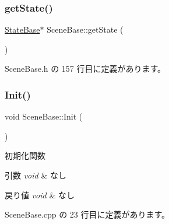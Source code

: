 \subsubsection{\texorpdfstring{get\+State()}{getState()}}
{\footnotesize\ttfamily \mbox{\hyperlink{class_scene_base_1_1_state_base}{State\+Base}}$\ast$ Scene\+Base\+::get\+State (\begin{DoxyParamCaption}{ }\end{DoxyParamCaption})\hspace{0.3cm}{\ttfamily [inline]}}



 Scene\+Base.\+h の 157 行目に定義があります。

\mbox{\label{class_scene_base_a494ba624fdd95b296e4487ed1a34f47b}} 
\subsubsection{\texorpdfstring{Init()}{Init()}}
{\footnotesize\ttfamily void Scene\+Base\+::\+Init (\begin{DoxyParamCaption}{ }\end{DoxyParamCaption})}



初期化関数 


\begin{DoxyParams}{引数}
{\em void} & なし \\
\hline
\end{DoxyParams}

\begin{DoxyRetVals}{戻り値}
{\em void} & なし \\
\hline
\end{DoxyRetVals}


 Scene\+Base.\+cpp の 23 行目に定義があります。

